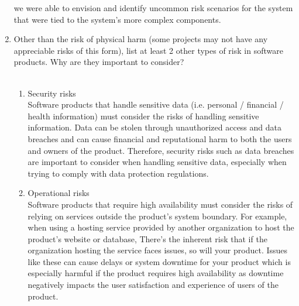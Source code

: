 \documentclass{article}
\begin{document}
\begin{enumerate}
  we were able to envision and identify uncommon risk scenarios for the system 
  that were tied to the system’s more complex components.
  \item Other than the risk of physical harm (some projects may not have any
  appreciable risks of this form), list at least 2 other types of risk in
  software products. Why are they important to consider?\\\\
  \begin{enumerate}
    \item Security risks\\
    Software products that handle sensitive data (i.e. personal / financial / 
    health information) must consider the risks of handling sensitive information. 
    Data can be stolen through unauthorized access and data breaches and can cause 
    financial and reputational harm to both the users and owners of the product. 
    Therefore, security risks such as data breaches are important to consider when 
    handling sensitive data, especially when trying to comply with data protection 
    regulations.
    \item Operational risks\\
    Software products that require high availability must consider the risks of 
    relying on services outside the product’s system boundary. For example, when 
    using a hosting service provided by another organization to host the product’s 
    website or database, There’s the inherent risk that if the organization hosting 
    the service faces issues, so will your product. Issues like these can cause 
    delays or system downtime for your product which is especially harmful if the 
    product requires high availability as downtime negatively impacts the user 
    satisfaction and experience of users of the product.
  \end{enumerate}

\end{enumerate}
\end{document}
